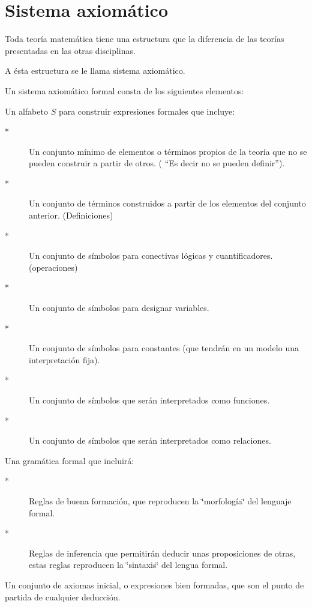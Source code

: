 \section{Sistema axiomático }

Toda teoría matemática tiene una estructura que la diferencia de las
teorías presentadas en las otras disciplinas.

A ésta estructura se le llama \textsf{sistema axiomático.}

Un sistema axiomático formal consta de los siguientes elementos: 

\begin{lista}

\item Un alfabeto $S$ para construir expresiones formales que incluye:
\begin{description}
\item [{{*}}] Un conjunto mínimo de elementos o términos propios de la
teoría que no se pueden construir a partir de otros. ( ``\textsf{Es
decir no se pueden definir}'').
\item [{{*}}] Un conjunto de términos construidos a partir de los elementos
del conjunto anterior. (Definiciones)
\item [{{*}}] Un conjunto de símbolos para conectivas lógicas y cuantificadores.
(operaciones)
\item [{{*}}] Un conjunto de símbolos para designar variables.
\item [{{*}}] Un conjunto de símbolos para constantes (que tendrán en un
modelo una interpretación fija). 
\item [{{*}}] Un conjunto de símbolos que serán interpretados como funciones. 
\item [{{*}}] Un conjunto de símbolos que serán interpretados como relaciones. 
\end{description}
\item Una gramática formal que incluirá:
\begin{description}
\item [{{*}}] Reglas de buena formación, que reproducen la \char`\"{}morfología\char`\"{}
del lenguaje formal.
\item [{{*}}] Reglas de inferencia que permitirán deducir unas proposiciones
de otras, estas reglas reproducen la \char`\"{}sintaxis\char`\"{}
del lengua formal. 
\end{description}
\item Un conjunto de axiomas inicial, o expresiones bien formadas,
que son el punto de partida de cualquier deducción. 

\end{lista}

